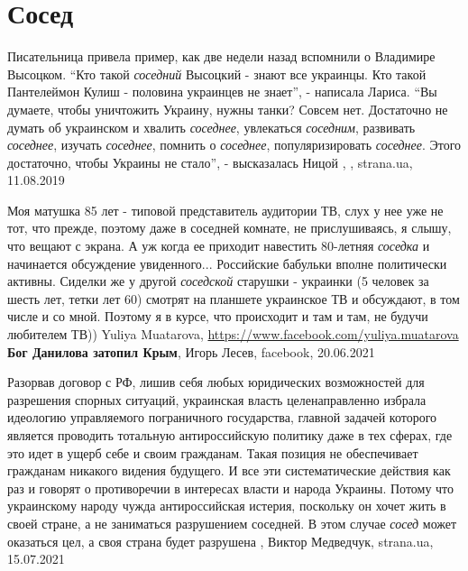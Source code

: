  
 
 
 
 
\chapter{Сосед}
\label{sec:slova.sosed}

Писательница привела пример, как две недели назад вспомнили о Владимире
Высоцком. \enquote{Кто такой \emph{соседний} Высоцкий - знают все украинцы. Кто
такой Пантелеймон Кулиш - половина украинцев не знает}, - написала Лариса.
\enquote{Вы думаете, чтобы уничтожить Украину, нужны танки? Совсем нет.
Достаточно не думать об украинском и хвалить \emph{соседнее}, увлекаться
\emph{соседним}, развивать \emph{соседнее}, изучать \emph{соседнее}, помнить о
\emph{соседнее}, популяризировать \emph{соседнее}.  Этого достаточно, чтобы
Украины не стало}, - высказалась Ницой
, , strana.ua, 11.08.2019

Моя матушка 85 лет - типовой представитель аудитории ТВ, слух
у нее уже не тот, что прежде, поэтому даже в соседней комнате, не
прислушиваясь, я слышу, что вещают с экрана. А уж когда ее приходит навестить
80-летняя \emph{соседка} и начинается обсуждение увиденного... Российские
бабульки вполне политически активны. Сиделки же у другой \emph{соседской}
старушки - украинки (5 человек за шесть лет, тетки лет 60) смотрят на планшете
украинское ТВ и обсуждают, в том числе и со мной. Поэтому я в курсе, что
происходит и там и там, не будучи любителем ТВ))
Yuliya Muatarova, \url{https://www.facebook.com/yuliya.muatarova}
\textbf{Бог Данилова затопил Крым}, Игорь Лесев, facebook, 20.06.2021

Разорвав договор с РФ, лишив себя любых юридических возможностей для разрешения
спорных ситуаций, украинская власть целенаправленно избрала идеологию
управляемого пограничного государства, главной задачей которого является
проводить тотальную антироссийскую политику даже в тех сферах, где это идет в
ущерб себе и своим гражданам. Такая позиция не обеспечивает гражданам никакого
видения будущего.  И все эти систематические действия как раз и говорят о
противоречии в интересах власти и народа Украины. Потому что украинскому народу
чужда антироссийская истерия, поскольку он хочет жить в своей стране, а не
заниматься разрушением соседней. В этом случае \emph{сосед} может оказаться цел, а
своя страна будет разрушена
, 
Виктор Медведчук, strana.ua, 15.07.2021

